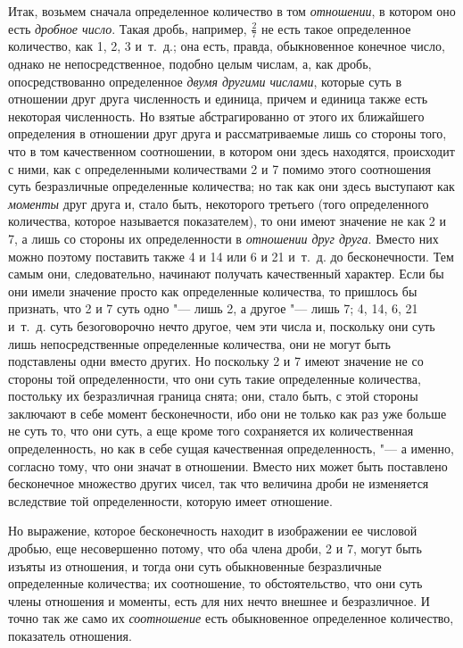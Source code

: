 Итак, возьмем сначала определенное количество в том
{\em отношении}, в котором оно есть
{\em дробное число}. Такая дробь, например, $\frac 2 7$
не есть такое определенное количество, как 1, 2, 3 и~т.~д.; она есть,
правда, обыкновенное конечное число, однако не непосредственное, подобно
целым числам, а, как дробь, опосредствованно определенное
{\em двумя другими числами}, которые суть в отношении
друг друга численность и единица, причем и единица также есть некоторая
численность. Но взятые абстрагированно от этого их ближайшего определения в
отношении друг друга и рассматриваемые лишь со стороны того, что в том
качественном соотношении, в котором они здесь находятся, происходит с ними,
как с определенными количествами 2 и 7 помимо этого соотношения суть
безразличные определенные количества; но так как они здесь выступают как
{\em моменты} друг друга и, стало быть, некоторого
третьего (того определенного количества, которое называется показателем),
то они имеют значение не как 2 и 7, а лишь со стороны их определенности в
{\em отношении друг друга}. Вместо них можно поэтому
поставить также 4 и 14 или 6 и 21 и~т.~д. до бесконечности. Тем самым они,
следовательно, начинают получать качественный характер. Если бы они имели
значение просто как определенные количества, то пришлось бы признать, что 2
и 7 суть одно "--- лишь 2, а другое "--- лишь 7; 4, 14, 6, 21 и~т.~д. суть
безоговорочно нечто другое, чем эти числа и, поскольку они суть лишь
непосредственные определенные количества, они не могут быть подставлены
одни вместо других. Но поскольку 2 и 7 имеют значение не со стороны той
определенности, что они суть такие определенные количества, постольку их
безразличная граница снята; они, стало быть, с этой стороны заключают в
себе момент бесконечности, ибо они не только как раз уже больше не суть то,
что они суть, а еще кроме того сохраняется их количественная
определенность, но как в себе сущая качественная определенность, "--- а
именно, согласно тому, что они значат в отношении. Вместо них может быть
поставлено бесконечное множество других чисел, так что величина дроби не
изменяется вследствие той определенности, которую имеет отношение.

Но выражение, которое бесконечность находит в изображении ее числовой
дробью, еще несовершенно потому, что оба члена дроби, 2 и 7, могут быть
изъяты из отношения, и тогда они суть обыкновенные безразличные
определенные количества; их соотношение, то обстоятельство, что они суть
члены отношения и моменты, есть для них нечто внешнее и безразличное. И
точно так же само их {\em соотношение} есть
обыкновенное определенное количество, показатель отношения.


